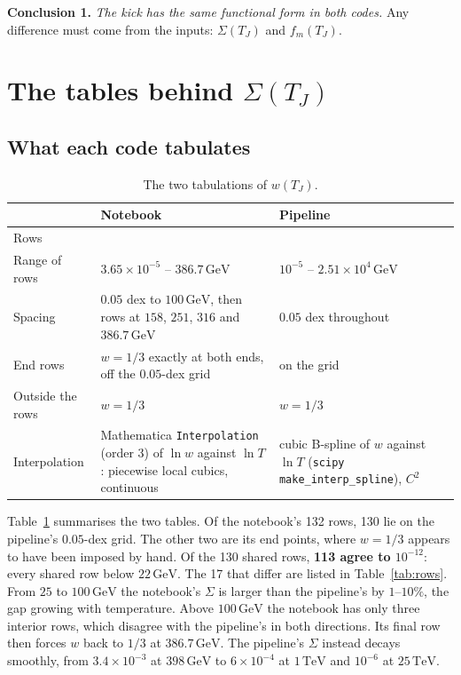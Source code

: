\documentclass[11pt,a4paper]{article}
\newcommand{\TJ}{T_{J}}
\newcommand{\GeV}{\,\mathrm{GeV}}
\newcommand{\code}[1]{\texttt{#1}}
\begin{document}
\medskip\noindent
\textbf{Conclusion 1.} \emph{The kick has the same functional form in both codes.} Any
difference must come from the inputs: $\Sigma(\TJ)$ and $f_m(\TJ)$.

\section{The tables behind \texorpdfstring{$\Sigma(\TJ)$}{Sigma(T\_J)}}
\label{sec:tables}

\subsection{What each code tabulates}

\begin{table}[ht]
\centering\footnotesize
\begin{tabular}{@{}>{\raggedright\arraybackslash}p{2.3cm}>{\raggedright\arraybackslash}p{6.0cm}>{\raggedright\arraybackslash}p{5.6cm}@{}}
\toprule
 & Notebook & Pipeline \\
\midrule
Rows & 132 & 189 \\
Range of rows & $3.65\times10^{-5}$ -- $386.7\GeV$ & $10^{-5}$ -- $2.51\times10^{4}\GeV$ \\
Spacing & $0.05$ dex to $100\GeV$, then rows at $158$, $251$, $316$ and $386.7\GeV$ & $0.05$ dex throughout \\
End rows & $w = 1/3$ exactly at both ends, off the $0.05$-dex grid & on the grid \\
Outside the rows & $w = 1/3$ & $w = 1/3$ \\
Interpolation & Mathematica \code{Interpolation} (order 3) of $\ln w$ against $\ln T$:
  piecewise local cubics, continuous &
  cubic B-spline of $w$ against $\ln T$ (\code{scipy} \code{make\_interp\_spline}), $C^2$ \\
\bottomrule
\end{tabular}
\caption{The two tabulations of $w(\TJ)$.}
\label{tab:tables}
\end{table}

Table~\ref{tab:tables} summarises the two tables. Of the notebook's 132 rows, 130 lie on the
pipeline's $0.05$-dex grid. The other two are its end points, where $w = 1/3$ appears to have
been imposed by hand. Of the 130 shared rows, \textbf{113 agree to $10^{-12}$}: every shared row
below $22\GeV$. The 17 that differ are listed in Table~\ref{tab:rows}. From $25$ to $100\GeV$
the notebook's $\Sigma$ is larger than the pipeline's by $1$--$10\%$, the gap growing with
temperature. Above $100\GeV$ the notebook has only three interior rows, which disagree with the
pipeline's in both directions. Its final row then forces $w$ back to $1/3$ at $386.7\GeV$.
The pipeline's $\Sigma$ instead decays smoothly, from $3.4\times10^{-3}$ at $398\GeV$ to
$6\times10^{-4}$ at $1\,\mathrm{TeV}$ and $10^{-6}$ at $25\,\mathrm{TeV}$.
\end{document}
